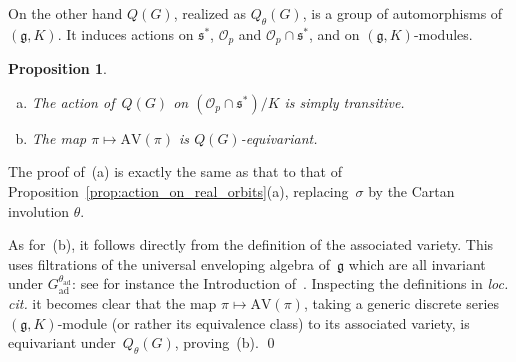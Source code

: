 \documentclass[cupthm]{CUP-JNL-JMJ}
\numberwithin{equation}{section}
\theoremstyle{cupplain}
\newtheorem{proposition}{Proposition}[section]
\theoremstyle{cupdefinition}
\theoremstyle{cupremark}
\theoremstyle{cupproof}
\newcommand{\kernel}{\mathrm{kernel}}
\newcommand{\ad}{\mathrm{ad}}
\newcommand{\Gad}{G_\mathrm{ad}}
\newcommand{\Stab}{\mathrm{Stab}}
\renewcommand{\O}{\mathcal O}
\newcommand{\R}{\mathbb R}
\newcommand{\g}{\mathfrak g}
\newcommand{\s}{\mathfrak s}
\newcommand{\AV}{\mathrm{AV}}
\newcommand{\Op}{\O_p}
\begin{document}

On the other hand $Q(G)$, realized as $Q_\theta(G)$, is a group of automorphisms of $(\g,K)$.
It induces actions on $\s^*$, $\Op$ and $\Op\cap\s^*$, and on $(\g,K)$-modules.

\begin{proposition}\label{prop:action_on_K_orbits}~
\begin{enumerate}[(a)]
\item The action of~$Q(G)$ on $(\Op \cap \s^*)/K$ is simply transitive.
\item The map $\pi \mapsto \AV(\pi)$ is $Q(G)$-equivariant.
\end{enumerate}
\end{proposition}

The proof of~(a) is exactly the same as that  to that of Proposition~\ref{prop:action_on_real_orbits}(a), replacing~$\sigma$ by the Cartan involution $\theta$.

As for~(b), it follows directly from the definition of the associated variety. This uses filtrations of the universal enveloping algebra of~$\g$ which are all invariant under $\Gad^{\theta_{\ad}}$: see for instance the Introduction of~\cite{vogan_bowdoin}. Inspecting the definitions in \emph{loc. cit.} it becomes clear that the map $\pi \mapsto \AV(\pi)$, taking a generic discrete series $(\g,K)$-module  (or rather its equivalence class) to its associated variety, is equivariant under~$Q_{\theta}(G)$, proving~(b). 
\qed
\end{document}

